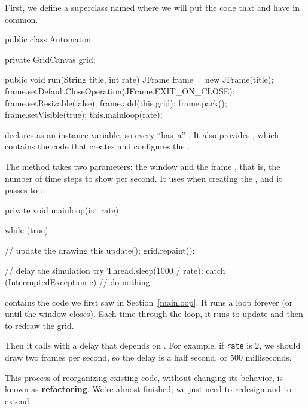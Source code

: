 First, we define a superclass named  where we will put the code that  and  have in common.

\begin{code}
public class Automaton {
    private GridCanvas grid;

    public void run(String title, int rate) {
        JFrame frame = new JFrame(title);
        frame.setDefaultCloseOperation(JFrame.EXIT_ON_CLOSE);
        frame.setResizable(false);
        frame.add(this.grid);
        frame.pack();
        frame.setVisible(true);
        this.mainloop(rate);
    }
}
\end{code}

 declares  as an instance variable, so every  ``has~a'' .
It also provides , which contains the code that creates and configures the .

The  method takes two parameters: the window  and the frame , that is, the number of time steps to show per second.
It uses  when creating the , and it passes  to :

\begin{code}
private void mainloop(int rate) {
    while (true) {

        // update the drawing
        this.update();
        grid.repaint();

        // delay the simulation
        try {
            Thread.sleep(1000 / rate);
        } catch (InterruptedException e) {
            // do nothing
        }
    }
}
\end{code}

 contains the code we first saw in Section~\ref{mainloop}.
It runs a  loop forever (or until the window closes).
Each time through the loop, it runs  to update  and then  to redraw the grid.

Then it calls  with a delay that depends on .
For example, if {\tt rate} is 2, we should draw two frames per second, so the delay is a half second, or 500 milliseconds.


This process of reorganizing existing code, without changing its behavior, is known as {\bf refactoring}.
We're almost finished; we just need to redesign  and  to extend .


